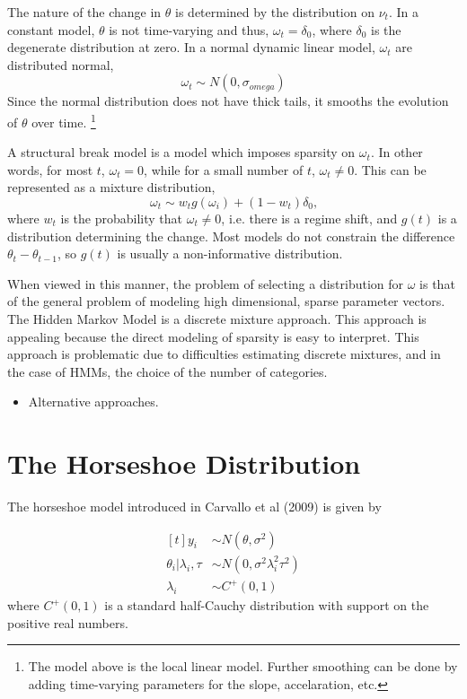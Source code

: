 \documentclass{article}
\begin{document}
The nature of the change in $\theta$ is determined by the distribution on $\nu_t$.  
In a constant model, $\theta$ is not time-varying and thus, $\omega_{t} = \delta_{0}$, where $\delta_{0}$ is the degenerate distribution at zero.
In a normal dynamic linear model, $\omega_{t}$ are distributed normal, 
\begin{equation}
  \label{eq:2}
  \omega_{t} \sim N(0, \sigma_{omega})
\end{equation}
Since the normal distribution does not have thick tails, it smooths the evolution of $\theta$ over time.
\footnote{
  The model above is the local linear model. 
  Further smoothing can be done by adding time-varying parameters for the slope, accelaration, etc.
}

A structural break model is a model which imposes sparsity on $\omega_{t}$. 
In other words, for most $t$, $\omega_{t} = 0$, while for a small number of $t$, $\omega_{t} \neq 0$.
This can be represented as a mixture distribution,
\begin{equation}
  \label{eq:1}
  \omega_{t} \sim w_{t} g(\omega_{i}) + (1 - w_{t}) \delta_{0} \text{,}
\end{equation}
where $w_{t}$ is the probability that $\omega_{t} \neq 0$, i.e. there is a regime shift, and 
$g(t)$ is a distribution determining the change. Most models do not constrain the difference $\theta_{t} - \theta_{t-1}$, so 
$g(t)$ is usually a non-informative distribution.

When viewed in this manner, the problem of selecting a distribution for $\omega$ is that of the general problem of modeling high dimensional, sparse parameter vectors.
The Hidden Markov Model is a discrete mixture approach. 
This approach is appealing because the direct modeling of sparsity is easy to interpret. 
This approach is problematic due to difficulties estimating discrete mixtures, and in the case of HMMs, the choice of the number of categories.

\begin{itemize}
\item Alternative approaches. 
\end{itemize}

\section{The Horseshoe Distribution}

The horseshoe model introduced in Carvallo et al (2009) is given by 

\begin{equation}
  \label{eq:3}
  \begin{aligned}[t]
    y_{i} & \sim N(\theta, \sigma^{2}) \\
    \theta_{i} | \lambda_{i}, \tau & \sim N(0, \sigma^{2} \lambda_{i}^{2} \tau^{2}) \\
    \lambda_{i} & \sim C^{+}(0, 1)
  \end{aligned}
\end{equation}
where $C^{+}(0, 1)$ is a standard half-Cauchy distribution with support on the positive real numbers.
\end{document}

